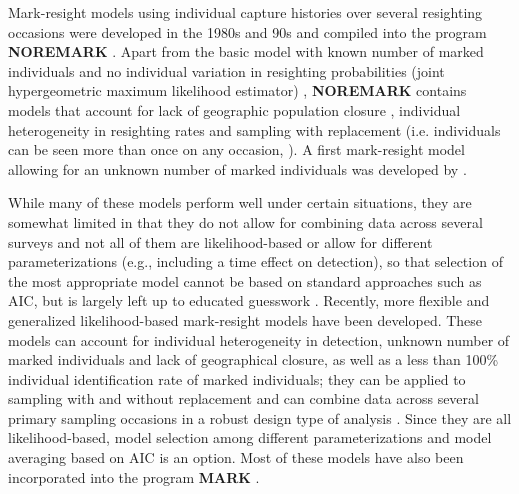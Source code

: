 Mark-resight models using individual capture histories
over several resighting occasions were developed in the 1980s and
90s and compiled into the program \textbf{NOREMARK} \citep{white:1996}. Apart
from the basic model with known number of marked individuals and no
individual variation in resighting probabilities (joint hypergeometric
maximum likelihood estimator) \citep{bartmann_etal:1987,
  white_garrot:1990, neal:1990, neal_etal:1993}, \textbf{NOREMARK} contains
models that account for lack of geographic population closure
\citep{neal_etal:1993}, individual heterogeneity in resighting rates
and sampling with replacement (i.e. individuals can be seen more than
once on any occasion, \citep{minta_mangel:1989, bowden:1993}). A first
mark-resight model allowing for an unknown number of marked
individuals was developed by \citet{arnason_etal:1991}.

While many of these models perform well under certain situations, they
are somewhat limited in that they do not allow for combining data
across several surveys \citep{mcclintock_etal:2006} and not all of
them are likelihood-based or allow for different parameterizations
(e.g., including a time effect on detection), so that selection of the
most appropriate model cannot be based on standard approaches such as
AIC, but is largely left up to educated guesswork
\citep{mcclintock_etal:2006}. Recently, more flexible and generalized
likelihood-based mark-resight models have been developed. These models
can account for individual heterogeneity in detection, unknown number
of marked individuals and lack of geographical closure, as well as a
less than 100\% individual identification rate of marked individuals;
they can be applied to sampling with and without replacement and can
combine data across several primary sampling occasions in a robust
design type of analysis
\citep{mcclintock_etal:2009biometrics,mcclintock_etal:2009mdp}. Since
they are all likelihood-based, model selection among different
parameterizations and model averaging based on AIC is an option. Most
of these models have also been incorporated into the program {\bf
  MARK} \citep{mcclintock_white:2010}.

